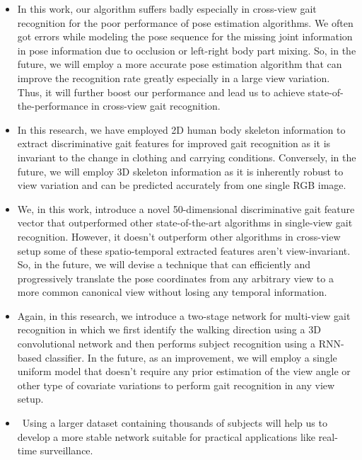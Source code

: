 \begin{itemize}
\item In this work, our algorithm suffers badly especially in cross-view gait recognition for the poor performance of pose estimation algorithms. We often got errors while modeling the pose sequence for the missing joint information in pose information due to occlusion or left-right body part mixing. So, in the future, we will employ a more accurate pose estimation algorithm that can improve the recognition rate greatly especially in a large view variation. Thus, it will further boost our performance and lead us to achieve state-of-the-performance in cross-view gait recognition.

\item In this research, we have employed 2D human body skeleton information to extract discriminative gait features for improved gait recognition as it is invariant to the change in clothing and carrying conditions. Conversely, in the future, we will employ 3D skeleton information as it is inherently robust to view variation and can be predicted accurately from one single RGB image.

\item We, in this work, introduce a novel 50-dimensional discriminative gait feature vector that outperformed other state-of-the-art algorithms in single-view gait recognition. However, it doesn't outperform other algorithms in cross-view setup some of these spatio-temporal extracted features aren't view-invariant. So, in the future, we will devise a technique that can efficiently and progressively translate the pose coordinates from any arbitrary view to a more common canonical view without losing any temporal information.

\item Again, in this research, we introduce a two-stage network for multi-view gait recognition in which we first identify the walking direction using a 3D convolutional network and then performs subject recognition using a RNN-based classifier. In the future, as an improvement, we will employ a single uniform model that doesn't require any prior estimation of the view angle or other type of covariate variations to perform gait recognition in any view setup.

\item  Using a larger dataset containing thousands of subjects will help us to develop a more stable network suitable for practical applications like real-time surveillance. 
\end{itemize}



